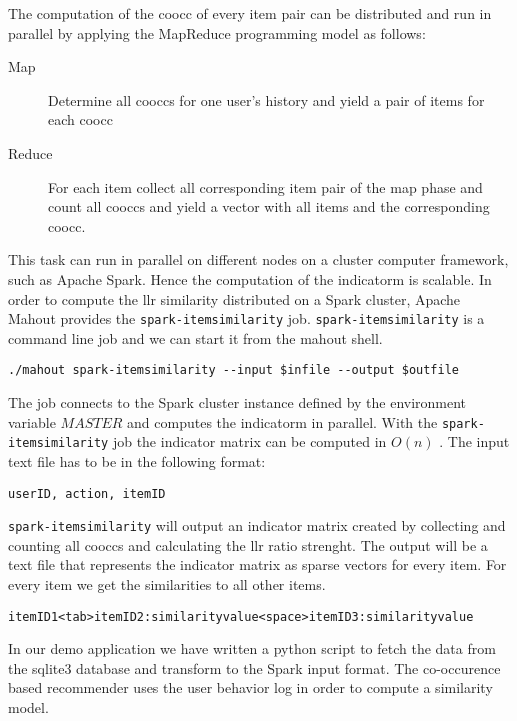 The computation of the \gls{coocc} of every item pair can be distributed and run in parallel by applying the MapReduce programming model as follows:
\begin{description}
\item[Map] Determine all \glspl{coocc} for one user's history and yield a pair of items for each \gls{coocc}
\item[Reduce] For each item collect all corresponding item pair of the map phase and count all \glspl{coocc} and yield a vector with all items and the corresponding \gls{coocc}.
\end{description}

This task can run in parallel on different nodes on a cluster computer framework, such as Apache Spark. Hence the computation of the \gls{indicatorm} is \gls{scalable}.
In order to compute the \gls{llr} similarity distributed on a Spark cluster, Apache Mahout provides the \verb|spark-itemsimilarity| job. 
\verb|spark-itemsimilarity| is a command line job and we can start it from the mahout shell.
\begin{verbatim}
./mahout spark-itemsimilarity --input $infile --output $outfile
\end{verbatim}
The job connects to the Spark cluster instance defined by the environment variable $MASTER$ and computes the \gls{indicatorm} in parallel. With the \verb|spark-itemsimilarity| job the indicator matrix can be computed in $O(n)$ \cite{Schelter}. 
The input text file has to be in the following format:
\begin{verbatim}
userID, action, itemID
\end{verbatim}
\verb|spark-itemsimilarity| will output an indicator matrix created by collecting and counting all \glspl{coocc} and calculating the \gls{llr} ratio strenght. The output will be a text file that represents the indicator matrix as sparse vectors for every item. For every item we get the similarities to all other items.
\begin{verbatim}
itemID1<tab>itemID2:similarityvalue<space>itemID3:similarityvalue
\end{verbatim}

In our demo application we have written a python script to fetch the data from the sqlite3 database and transform to the Spark input format.
The co-occurence based recommender uses the user behavior log in order to compute a similarity model. 

